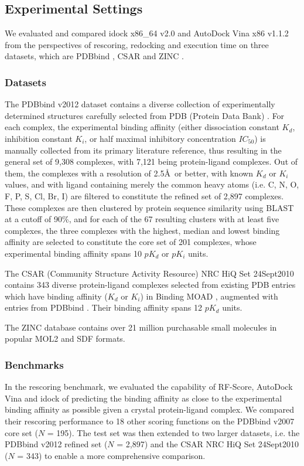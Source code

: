\subsection{Experimental Settings}
We evaluated and compared idock x86\_64 v2.0 and AutoDock Vina x86 v1.1.2 from the perspectives of rescoring, redocking and execution time on three datasets, which are PDBbind \cite{529,530}, CSAR \cite{857,960} and ZINC \cite{532,1178}.

\subsubsection{Datasets}
The PDBbind v2012 dataset contains a diverse collection of experimentally determined structures carefully selected from PDB (Protein Data Bank) \cite{540,537}. For each complex, the experimental binding affinity (either dissociation constant $K_d$, inhibition constant $K_i$, or half maximal inhibitory concentration $IC_{50}$) is manually collected from its primary literature reference, thus resulting in the general set of 9,308 complexes, with 7,121 being protein-ligand complexes. Out of them, the complexes with a resolution of 2.5\AA\ or better, with known $K_d$ or $K_i$ values, and with ligand containing merely the common heavy atoms (i.e. C, N, O, F, P, S, Cl, Br, I) are filtered to constitute the refined set of 2,897 complexes. These complexes are then clustered by protein sequence similarity using BLAST at a cutoff of 90\%, and for each of the 67 resulting clusters with at least five complexes, the three complexes with the highest, median and lowest binding affinity are selected to constitute the core set of 201 complexes, whose experimental binding affinity spans 10 $pK_d$ or $pK_i$ units.

The CSAR (Community Structure Activity Resource) NRC HiQ Set 24Sept2010 contains 343 diverse protein-ligand complexes selected from existing PDB \cite{540,537} entries which have binding affinity ($K_d$ or $K_i$) in Binding MOAD \cite{517,518}, augmented with entries from PDBbind \cite{529,530}. Their binding affinity spans 12 $pK_d$ units.

The ZINC database contains over 21 million purchasable small molecules in popular MOL2 and SDF formats.

\subsubsection{Benchmarks}
In the rescoring benchmark, we evaluated the capability of RF-Score, AutoDock Vina and idock of predicting the binding affinity as close to the experimental binding affinity as possible given a crystal protein-ligand complex. We compared their rescoring performance to 18 other scoring functions on the PDBbind v2007 core set ($N$ = 195). The test set was then extended to two larger datasets, i.e. the PDBbind v2012 \cite{529,530} refined set ($N$ = 2,897) and the CSAR NRC HiQ Set 24Sept2010 ($N$ = 343) \cite{857,960} to enable a more comprehensive comparison.

